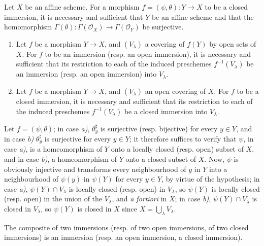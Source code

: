 \begin{corollary}[4.2.3]
\label{I.4.2.3}
Let $X$ be an affine scheme. For a morphism
$f=(\psi,\theta):Y\to X$ to be a closed immersion, it is necessary and
sufficient that $Y$ be an affine scheme and that the homomorphism
$\Gamma(\theta):\Gamma(\mathscr{O}_X)\to\Gamma(\mathscr{O}_Y)$ be surjective.
\end{corollary}

\begin{corollary}[4.2.4]
\label{I.4.2.4}
\begin{enumerate}
  \item[\textup{a)}] Let $f$ be a morphism $Y\to X$, and $(V_\lambda)$ a covering
  of $f(Y)$ by open sets of $X$. For $f$ to be an immersion (\textup{resp.} an
  open immersion), it is necessary and sufficient
  that its restriction to each of the induced preschemes $f^{-1}(V_\lambda)$ be
  an immersion (\textup{resp.} an open immersion) into $V_\lambda$.
  \item[\textup{b)}] Let $f$ be a morphism $Y\to X$, and $(V_\lambda)$ an open covering
  of $X$. For $f$ to be a closed immersion, it is necessary and sufficient
  that its restriction to each of the induced preschemes $f^{-1}(V_\lambda)$ be
  a closed immersion into $V_\lambda$.
\end{enumerate}
\end{corollary}

Let $f=(\psi,\theta)$; in case \emph{a)}, $\theta_y^\sharp$ is surjective
(resp. bijective) for every $y\in Y$, and in case \emph{b)} $\theta_y^\sharp$ is
surjective for every $y\in Y$; it therefore suffices to verify that $\psi$, in
case \emph{a)}, is a homeomorphism of $Y$ onto a locally closed (resp.
open) subset of $X$, and in case \emph{b)}, a homeomorphism of $Y$ onto a closed
subset of $X$. Now, $\psi$ is obviously injective and transforms every
neighbourhood of $y$ in $Y$ into a neighbourhood of $\psi(y)$ in $\psi(Y)$ for
every $y\in Y$, by virtue of the hypothesis; in case \emph{a)}, $\psi(Y)\cap V_\lambda$
is locally closed (resp. open) in $V_\lambda$, so $\psi(Y)$ is locally closed
(resp. open) in the union of the $V_\lambda$, and \emph{a fortiori} in $X$;
in case \emph{b)}, $\psi(Y)\cap V_\lambda$ is closed in $V_\lambda$, so
$\psi(Y)$ is closed in $X$ since $X=\bigcup_\lambda V_\lambda$.

\begin{proposition}[4.2.5]
\label{I.4.2.5}
The composite of two immersions (\textup{resp.} of two open immersions, of two
closed immersions) is an immersion (\textup{resp.} an open immersion, a
closed immersion).
\end{proposition}

